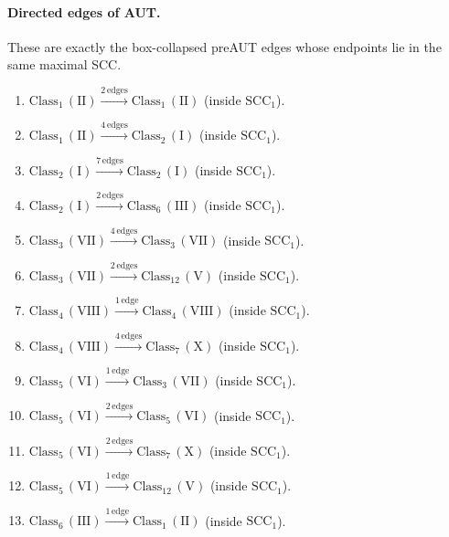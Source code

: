 \paragraph{Directed edges of AUT.}
These are exactly the box-collapsed preAUT edges whose endpoints lie in the same maximal SCC.
\begin{enumerate}[leftmargin=*]
\item $\mathrm{Class}_{1}\,(\mathrm{II}) \xrightarrow{2\,\mathrm{edges}} \mathrm{Class}_{1}\,(\mathrm{II})$ (inside $\mathrm{SCC}_{1}$).
\item $\mathrm{Class}_{1}\,(\mathrm{II}) \xrightarrow{4\,\mathrm{edges}} \mathrm{Class}_{2}\,(\mathrm{I})$ (inside $\mathrm{SCC}_{1}$).
\item $\mathrm{Class}_{2}\,(\mathrm{I}) \xrightarrow{7\,\mathrm{edges}} \mathrm{Class}_{2}\,(\mathrm{I})$ (inside $\mathrm{SCC}_{1}$).
\item $\mathrm{Class}_{2}\,(\mathrm{I}) \xrightarrow{2\,\mathrm{edges}} \mathrm{Class}_{6}\,(\mathrm{III})$ (inside $\mathrm{SCC}_{1}$).
\item $\mathrm{Class}_{3}\,(\mathrm{VII}) \xrightarrow{4\,\mathrm{edges}} \mathrm{Class}_{3}\,(\mathrm{VII})$ (inside $\mathrm{SCC}_{1}$).
\item $\mathrm{Class}_{3}\,(\mathrm{VII}) \xrightarrow{2\,\mathrm{edges}} \mathrm{Class}_{12}\,(\mathrm{V})$ (inside $\mathrm{SCC}_{1}$).
\item $\mathrm{Class}_{4}\,(\mathrm{VIII}) \xrightarrow{1\,\mathrm{edge}} \mathrm{Class}_{4}\,(\mathrm{VIII})$ (inside $\mathrm{SCC}_{1}$).
\item $\mathrm{Class}_{4}\,(\mathrm{VIII}) \xrightarrow{4\,\mathrm{edges}} \mathrm{Class}_{7}\,(\mathrm{X})$ (inside $\mathrm{SCC}_{1}$).
\item $\mathrm{Class}_{5}\,(\mathrm{VI}) \xrightarrow{1\,\mathrm{edge}} \mathrm{Class}_{3}\,(\mathrm{VII})$ (inside $\mathrm{SCC}_{1}$).
\item $\mathrm{Class}_{5}\,(\mathrm{VI}) \xrightarrow{2\,\mathrm{edges}} \mathrm{Class}_{5}\,(\mathrm{VI})$ (inside $\mathrm{SCC}_{1}$).
\item $\mathrm{Class}_{5}\,(\mathrm{VI}) \xrightarrow{2\,\mathrm{edges}} \mathrm{Class}_{7}\,(\mathrm{X})$ (inside $\mathrm{SCC}_{1}$).
\item $\mathrm{Class}_{5}\,(\mathrm{VI}) \xrightarrow{1\,\mathrm{edge}} \mathrm{Class}_{12}\,(\mathrm{V})$ (inside $\mathrm{SCC}_{1}$).
\item $\mathrm{Class}_{6}\,(\mathrm{III}) \xrightarrow{1\,\mathrm{edge}} \mathrm{Class}_{1}\,(\mathrm{II})$ (inside $\mathrm{SCC}_{1}$).

\end{enumerate}
